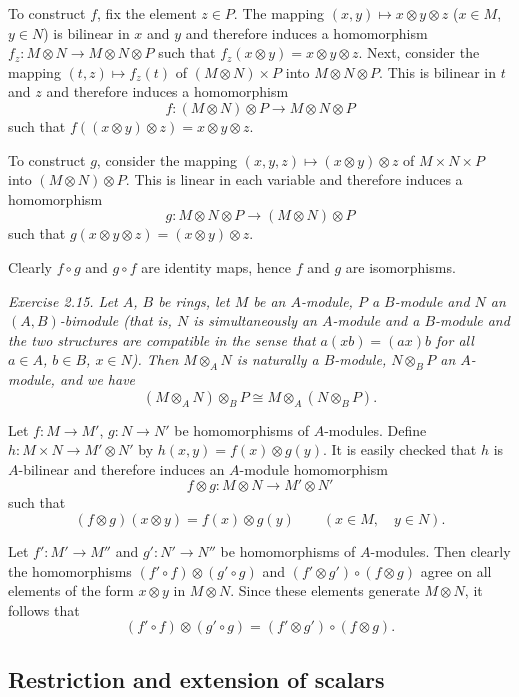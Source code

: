To construct $f$, fix the element $z\in P$. The mapping $(x,y)\mapsto x\otimes y\otimes z$ ($x\in M$, $y\in N$) is bilinear in $x$ and $y$ and therefore induces a homomorphism $f_z:M\otimes N\longrightarrow M\otimes N\otimes P$ such that $f_z(x\otimes y)=x\otimes y\otimes z$. Next, consider the mapping $(t,z)\mapsto f_z(t)$ of $(M\otimes N)\times P$ into $M\otimes N\otimes P$. This is bilinear in $t$ and $z$ and therefore induces a homomorphism
\[
 f:(M\otimes N)\otimes P\longrightarrow M\otimes N\otimes P
\]
such that $f((x\otimes y)\otimes z)=x\otimes y\otimes z$.

To construct $g$, consider the mapping $(x,y,z)\mapsto(x\otimes y)\otimes z$ of $M\times N\times P$ into $(M\otimes N)\otimes P$. This is linear in each variable and therefore induces a homomorphism
\[
 g:M\otimes N\otimes P\longrightarrow(M\otimes N)\otimes P
\]
such that $g(x\otimes y\otimes z)=(x\otimes y)\otimes z$.

Clearly $f\circ g$ and $g\circ f$ are identity maps, hence $f$ and $g$ are isomorphisms. \proofbox

\noindent\textit{Exercise 2.15. Let $A$, $B$ be rings, let $M$ be an $A$-module, $P$ a $B$-module and $N$ an $(A,B)$-bimodule (that is, $N$ is simultaneously an $A$-module and a $B$-module and the two structures are compatible in the sense that $a(xb)=(ax)b$ for all $a\in A$, $b\in B$, $x\in N$). Then $M\otimes_A N$ is naturally a $B$-module, $N\otimes_B P$ an $A$-module, and we have}
\[
 (M\otimes_A N)\otimes_B P\cong M\otimes_A(N\otimes_B P).
\]

Let $f:M\longrightarrow M'$, $g:N\longrightarrow N'$ be homomorphisms of $A$-modules. Define $h:M\times N\longrightarrow M'\otimes N'$ by $h(x,y)=f(x)\otimes g(y)$. It is easily checked that $h$ is $A$-bilinear and therefore induces an $A$-module homomorphism
\[
 f\otimes g:M\otimes N\longrightarrow M'\otimes N'
\]
such that
\[
 (f\otimes g)(x\otimes y)=f(x)\otimes g(y)\qquad(x\in M,\quad y\in N).
\]

Let $f':M'\longrightarrow M''$ and $g':N'\longrightarrow N''$ be homomorphisms of $A$-modules. Then clearly the homomorphisms $(f'\circ f)\otimes(g'\circ g)$ and $(f'\otimes g')\circ(f\otimes g)$ agree on all elements of the form $x\otimes y$ in $M\otimes N$. Since these elements generate $M\otimes N$, it follows that
\[
 (f'\circ f)\otimes(g'\circ g)=(f'\otimes g')\circ(f\otimes g).
\]

\subsection{Restriction and extension of scalars}

